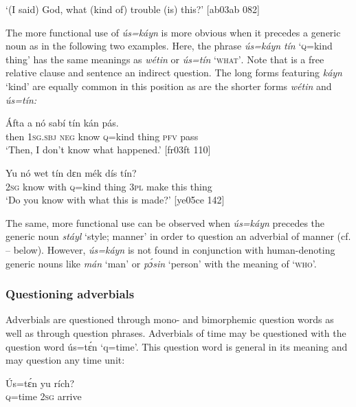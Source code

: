 \glt ‘(I said) God, what (kind of) trouble (is) this?’ [ab03ab 082]
\z

The more functional use of \textit{ús=káyn} is more obvious when it precedes a generic noun as in the following two examples. Here, the phrase \textit{ús=káyn} \textit{tín} ‘\textsc{q}=kind thing’ has the same meanings as \textit{wétin} or \textit{ús=tín} ‘\textsc{what’}. Note that  is a free relative clause and sentence  an indirect question. The long forms featuring \textit{káyn} ‘kind’ are equally common in this position as are the shorter forms \textit{wétin} and \textit{ús=tín:} 


\ea%
    \label{ex:key:620}
    \gll \'{A}fta    a    nó  sabí      tín    kán  pás.\\
then  \textsc{1sg.sbj}  \textsc{neg}  know  \textsc{q}=kind  thing  \textsc{pfv}  pass\\

\glt ‘Then, I don’t know what happened.’ [fr03ft 110]
\z


\ea%
    \label{ex:key:621}
    \gll Yu  nó    wet      tín    dɛn  mék    dís  tín?\\
\textsc{2sg}  know  with    \textsc{q}=kind  thing  \textsc{3pl}  make  this  thing\\

\glt ‘Do you know with what this is made?’ [ye05ce 142]
\z

The same, more functional use can be observed when \textit{ús=káyn} precedes the generic noun \textit{stáyl} ‘style; manner’ in order to question an adverbial of manner (cf. – below). However, \textit{ús=káyn} is not found in conjunction with human-denoting generic nouns like \textit{mán} ‘man’ or \textit{pɔ́sin} ‘person’ with the meaning of ‘\textsc{who’.}

\subsubsection{Questioning adverbials}

Adverbials are questioned through mono- and bimorphemic question words as well as through question phrases. Adverbials of time may be questioned with the question word ús=tɛ́n ‘q=time’. This question word is general in its meaning and may question any time unit:


\ea%
    \label{ex:key:622}
    \gll \'{U}s=tɛ́n  yu  rích?\\
\textsc{q}=time  \textsc{2sg}  arrive\\

